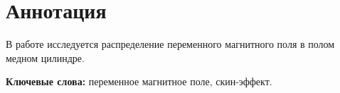 \section*{Аннотация}

В работе исследуется распределение переменного магнитного поля в полом медном цилиндре.

\textbf{Ключевые слова:} переменное магнитное поле, скин-эффект.